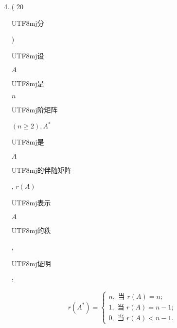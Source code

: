 \documentclass[10pt]{article}
\begin{document}
\begin{enumerate}
  \setcounter{enumi}{3}
  \item ( 20 \begin{CJK}{UTF8}{mj}分\end{CJK}) \begin{CJK}{UTF8}{mj}设\end{CJK} $A$ \begin{CJK}{UTF8}{mj}是\end{CJK} $n$ \begin{CJK}{UTF8}{mj}阶矩阵\end{CJK} $(n \geqslant 2), A^{*}$ \begin{CJK}{UTF8}{mj}是\end{CJK} $A$ \begin{CJK}{UTF8}{mj}的伴随矩阵\end{CJK}, $r(A)$ \begin{CJK}{UTF8}{mj}表示\end{CJK} $A$ \begin{CJK}{UTF8}{mj}的秩\end{CJK}, \begin{CJK}{UTF8}{mj}证明\end{CJK}:
\end{enumerate}
$$
r\left(A^{*}\right)=\left\{\begin{array}{l}
n, \text { 当 } r(A)=n ; \\
1, \text { 当 } r(A)=n-1 ; \\
0, \text { 当 } r(A)<n-1 .
\end{array}\right.
$$
\end{document}

